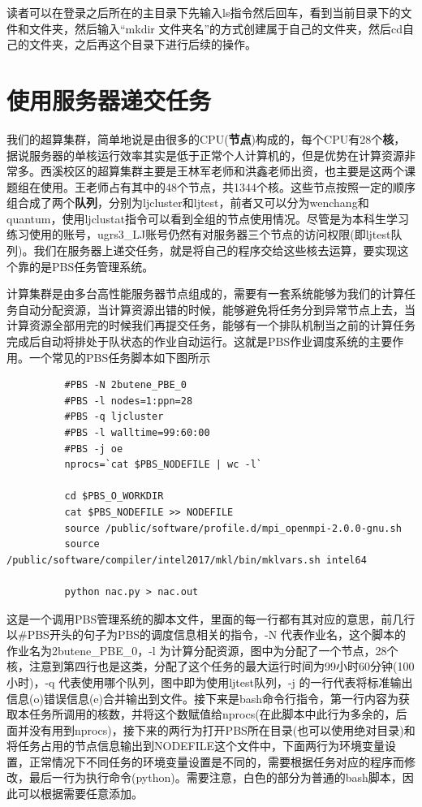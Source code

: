 \documentclass[12pt,a4paper,openany,twoside]{book}
\numberwithin{equation}{section}
\begin{document}
        读者可以在登录之后所在的主目录下先输入ls指令然后回车，看到当前目录下的文件和文件夹，然后输入“mkdir 文件夹名”的方式创建属于自己的文件夹，然后cd自己的文件夹，之后再这个目录下进行后续的操作。
      
      \section{使用服务器递交任务}
        我们的超算集群，简单地说是由很多的CPU(\textbf{节点})构成的，每个CPU有28个\textbf{核}，据说服务器的单核运行效率其实是低于正常个人计算机的，但是优势在计算资源非常多。西溪校区的超算集群主要是王林军老师和洪鑫老师出资，也主要是这两个课题组在使用。王老师占有其中的48个节点，共1344个核。这些节点按照一定的顺序组合成了两个\textbf{队列}，分别为ljcluster和ljtest，前者又可以分为wenchang和quantum，使用ljclustat指令可以看到全组的节点使用情况。尽管是为本科生学习练习使用的账号，ugrs3\_LJ账号仍然有对服务器三个节点的访问权限(即ljtest队列)。我们在服务器上递交任务，就是将自己的程序交给这些核去运算，要实现这个靠的是PBS任务管理系统。
        
        计算集群是由多台高性能服务器节点组成的，需要有一套系统能够为我们的计算任务自动分配资源，当计算资源出错的时候，能够避免将任务分到异常节点上去，当计算资源全部用完的时候我们再提交任务，能够有一个排队机制当之前的计算任务完成后自动将排处于队状态的作业自动运行。这就是PBS作业调度系统的主要作用。一个常见的PBS任务脚本如下图所示
        \begin{lstlisting}
          #PBS -N 2butene_PBE_0
          #PBS -l nodes=1:ppn=28
          #PBS -q ljcluster
          #PBS -l walltime=99:60:00
          #PBS -j oe
          nprocs=`cat $PBS_NODEFILE | wc -l`
          
          cd $PBS_O_WORKDIR
          cat $PBS_NODEFILE >> NODEFILE
          source /public/software/profile.d/mpi_openmpi-2.0.0-gnu.sh
          source /public/software/compiler/intel2017/mkl/bin/mklvars.sh intel64
          
          python nac.py > nac.out
        \end{lstlisting}

        这是一个调用PBS管理系统的脚本文件，里面的每一行都有其对应的意思，前几行以\#PBS开头的句子为PBS的调度信息相关的指令，-N 代表作业名，这个脚本的作业名为2butene\_PBE\_0，-l 为计算分配资源，图中为分配了一个节点，28个核，注意到第四行也是这类，分配了这个任务的最大运行时间为99小时60分钟(100小时)，-q 代表使用哪个队列，图中即为使用ljtest队列，-j 的一行代表将标准输出信息(o)错误信息(e)合并输出到文件。接下来是bash命令行指令，第一行内容为获取本任务所调用的核数，并将这个数赋值给nprocs(在此脚本中此行为多余的，后面并没有用到nprocs)，接下来的两行为打开PBS所在目录(也可以使用绝对目录)和将任务占用的节点信息输出到NODEFILE这个文件中，下面两行为环境变量设置，正常情况下不同任务的环境变量设置是不同的，需要根据任务对应的程序而修改，最后一行为执行命令(python)。需要注意，白色的部分为普通的bash脚本，因此可以根据需要任意添加。
\end{document}
